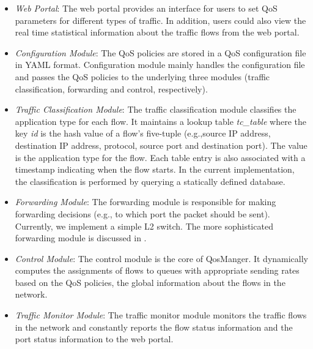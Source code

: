 \begin{itemize}
  \item \emph{Web Portal}: The web portal provides an interface for users to set QoS parameters for
    different types of traffic. In addition, users could also view the real time statistical information
    about the traffic flows from the web portal.
  \item \emph{Configuration Module}: The QoS policies are stored in a QoS configuration file in YAML
    format. Configuration module mainly handles the configuration file and passes the QoS policies
    to the underlying three modules (traffic classification, forwarding and control, respectively).
  \item \emph{Traffic Classification Module}: The traffic classification module classifies the application
    type for each flow. It maintains a lookup table \emph{tc\_table} where the key \emph{id} is the hash value of a
    flow's five-tuple (e.g.,source IP address, destination IP address, protocol, source port and destination port).
    The value is the application type for the flow. Each table entry is also associated with a timestamp indicating
    when the flow starts. In the current implementation, the classification is performed by querying a statically
    defined database.
  \item \emph{Forwarding Module}: The forwarding module is responsible for making forwarding decisions (e.g.,
    to which port the packet should be sent). Currently, we implement a simple L2 switch. The more sophisticated
    forwarding module is discussed in .
  \item \emph{Control Module}: The control module is the core of QosManger. It dynamically computes the
    assignments of flows to queues with appropriate sending rates based on the QoS policies, the global
    information about the flows in the network.
  \item \emph{Traffic Monitor Module}: The traffic monitor module monitors the traffic flows in the network
    and constantly reports the flow status information and the port status information to the web portal.
\end{itemize}

